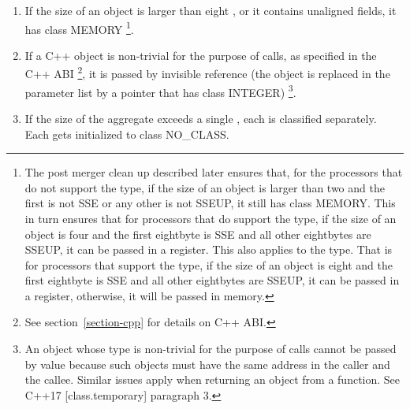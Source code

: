 \begin{enumerate}
\item If the size of an object is larger than eight \eightbytes, or
  it contains unaligned fields, it has class MEMORY
  \footnote{The post merger clean up described later ensures that,
  for the processors that do not support the  type, if
  the size of an object is larger than two \eightbytes and the first
  \eightbyte is not SSE or any other \eightbyte is not SSEUP, it still
  has class MEMORY. This in turn ensures that for processors that
  do support the  type, if the size of an object is
  four \eightbytes and the first eightbyte is SSE and all other
  eightbytes are SSEUP, it can be passed in a register. This also
  applies to the  type.  That is for processors that support
  the  type, if the size of an object is eight \eightbytes
  and the first eightbyte is SSE and all other eightbytes are SSEUP, it
  can be passed in a register, otherwise, it will be passed in memory.}.

\item If a C++ object is non-trivial for the purpose of calls, as
    specified in the C++ ABI \footnote{See section~\ref{section-cpp}
    for details on C++ ABI.},
    it is passed by invisible reference
    (the object is replaced in the parameter list by a pointer that
    has class INTEGER)
  \footnote{An object whose type is non-trivial for the purpose of
   calls cannot be passed by value because such objects must have the
   same address in the caller and the callee. Similar
   issues apply when returning an object from a function.
   See C++17 [class.temporary] paragraph 3.}.

\item If the size of the aggregate exceeds a single \eightbyte, each is
    classified separately.  Each \eightbyte gets initialized to class NO_CLASS.


\end{enumerate}
